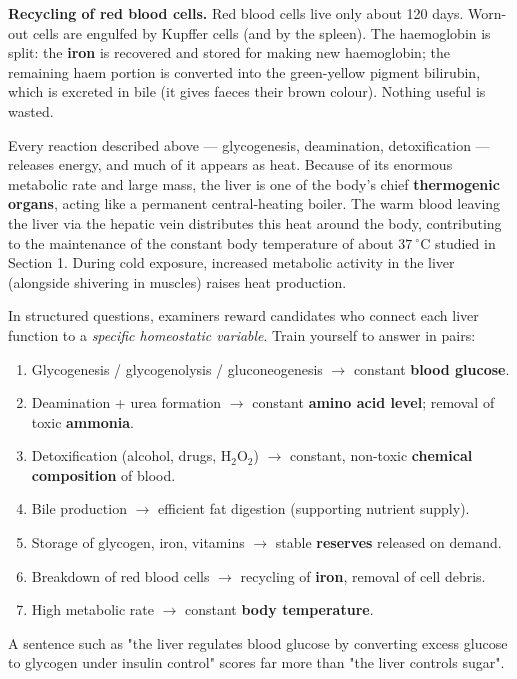 \documentclass[11pt]{article}
\newcommand{\cle}[1]{{\popxbold\color{popdark}#1}}
\newcounter{popsec}
\newcounter{popsub}
\newcommand{\courssub}[1]{%
  \stepcounter{popsub}%
  \par\vspace{9pt}\noindent{\popxbold\fontsize{11.5}{13}\selectfont\color{popink}{\color{poporange}\thepopsec.\thepopsub}\hspace{6pt}#1}\par\nopagebreak\vspace{4pt}
}
\begin{document}
\textbf{Recycling of red blood cells.} Red blood cells live only about 120 days. Worn-out cells are engulfed by \cle{Kupffer cells} (and by the spleen). The haemoglobin is split: the \textbf{iron} is recovered and stored for making new haemoglobin; the remaining haem portion is converted into the green-yellow pigment \cle{bilirubin}, which is excreted in bile (it gives faeces their brown colour). Nothing useful is wasted.

\courssub{The Liver as a Heat-Producing Organ}

Every reaction described above — glycogenesis, deamination, detoxification — releases energy, and much of it appears as \cle{heat}. Because of its enormous metabolic rate and large mass, the liver is one of the body's chief \textbf{thermogenic organs}, acting like a permanent central-heating boiler. The warm blood leaving the liver via the hepatic vein distributes this heat around the body, contributing to the maintenance of the constant body temperature of about $37\ ^{\circ}\mathrm{C}$ studied in Section 1. During cold exposure, increased metabolic activity in the liver (alongside shivering in muscles) raises heat production.

\begin{methode}
In structured questions, examiners reward candidates who connect each liver function to a \emph{specific homeostatic variable}. Train yourself to answer in pairs:
\begin{enumerate}
\item Glycogenesis / glycogenolysis / gluconeogenesis $\rightarrow$ constant \textbf{blood glucose}.
\item Deamination + urea formation $\rightarrow$ constant \textbf{amino acid level}; removal of toxic \textbf{ammonia}.
\item Detoxification (alcohol, drugs, $\mathrm{H_2O_2}$) $\rightarrow$ constant, non-toxic \textbf{chemical composition} of blood.
\item Bile production $\rightarrow$ efficient fat digestion (supporting nutrient supply).
\item Storage of glycogen, iron, vitamins $\rightarrow$ stable \textbf{reserves} released on demand.
\item Breakdown of red blood cells $\rightarrow$ recycling of \textbf{iron}, removal of cell debris.
\item High metabolic rate $\rightarrow$ constant \textbf{body temperature}.
\end{enumerate}
A sentence such as "the liver regulates blood glucose by converting excess glucose to glycogen under insulin control" scores far more than "the liver controls sugar".
\end{methode}
\end{document}
